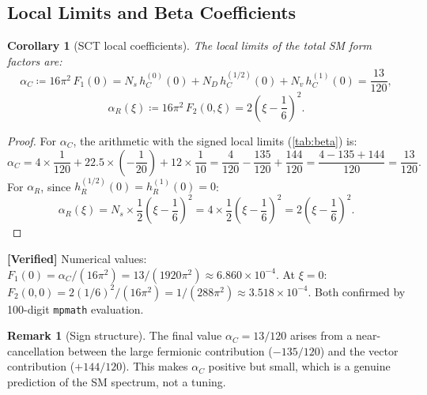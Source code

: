 \documentclass[11pt,a4paper]{article}
\theoremstyle{plain}
\newtheorem{corollary}[theorem]{Corollary}
\theoremstyle{definition}
\newtheorem{remark}[theorem]{Remark}
\newcommand{\verified}[1]{%
  \par\smallskip\noindent
  \colorbox{green!10}{\parbox{\dimexpr\linewidth-2\fboxsep}{%
    \textcolor{green!50!black}{\textbf{[Verified]}} #1}}%
  \par\smallskip}
\begin{document}
\subsection{Local Limits and Beta Coefficients}\label{ssec:local-limits}

\begin{corollary}[SCT local coefficients]\label{cor:local}
The local limits of the total SM form factors are:
\begin{equation}\label{eq:alpha_C}
  \boxed{\alpha_C \coloneqq 16\pi^2\, F_1(0)
    = N_s\, h_C^{(0)}(0) + N_D\, h_C^{(1/2)}(0)
    + N_v\, h_C^{(1)}(0) = \frac{13}{120},}
\end{equation}
\begin{equation}\label{eq:alpha_R}
  \boxed{\alpha_R(\xi) \coloneqq 16\pi^2\, F_2(0,\xi)
    = 2\left(\xi - \frac{1}{6}\right)^2.}
\end{equation}
\end{corollary}

\begin{proof}
For $\alpha_C$, the arithmetic with the signed local limits
(\cref{tab:beta}) is:
\begin{equation}\label{eq:alpha_C-arith}
  \alpha_C = 4 \times \frac{1}{120}
  + 22.5 \times \left(-\frac{1}{20}\right)
  + 12 \times \frac{1}{10}
  = \frac{4}{120} - \frac{135}{120} + \frac{144}{120}
  = \frac{4 - 135 + 144}{120} = \frac{13}{120}.
\end{equation}
For $\alpha_R$, since $h_R^{(1/2)}(0) = h_R^{(1)}(0) = 0$:
\begin{equation}
  \alpha_R(\xi) = N_s \times \frac{1}{2}\left(\xi - \frac{1}{6}\right)^2
  = 4 \times \frac{1}{2}\left(\xi - \frac{1}{6}\right)^2
  = 2\left(\xi - \frac{1}{6}\right)^2.
\end{equation}
\end{proof}

\verified{Numerical values: $F_1(0) = \alpha_C/(16\pi^2)
= 13/(1920\pi^2) \approx 6.860 \times 10^{-4}$. At $\xi = 0$:
$F_2(0,0) = 2(1/6)^2/(16\pi^2) = 1/(288\pi^2)
\approx 3.518 \times 10^{-4}$.
Both confirmed by 100-digit \texttt{mpmath} evaluation.}

\begin{remark}[Sign structure]\label{rem:signs}
The final value $\alpha_C = 13/120$ arises from a near-cancellation
between the large fermionic contribution ($-135/120$) and the vector
contribution ($+144/120$). This makes $\alpha_C$ positive but small,
which is a genuine prediction of the SM spectrum, not a tuning.
\end{remark}
\end{document}
